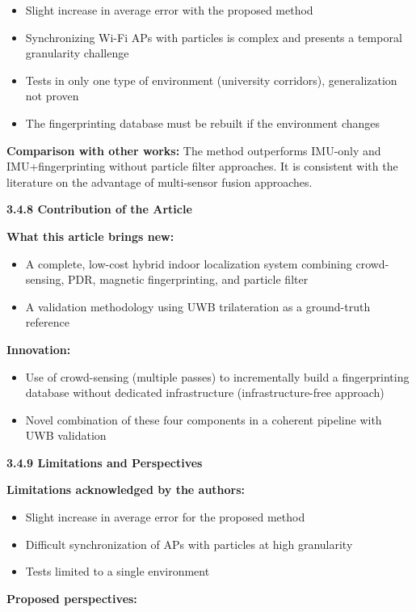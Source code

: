 \documentclass{ipgpmaster}
\begin{document}
\begin{itemize}
    \item Slight increase in average error with the proposed method
    \item Synchronizing Wi-Fi APs with particles is complex and presents a temporal granularity challenge
    \item Tests in only one type of environment (university corridors), generalization not proven
    \item The fingerprinting database must be rebuilt if the environment changes
\end{itemize}
\textbf{Comparison with other works:} The method outperforms IMU-only and IMU+fingerprinting without particle filter approaches. It is consistent with the literature on the advantage of multi-sensor fusion approaches.

 \textbf{3.4.8   Contribution of the Article}

\textbf{What this article brings new:}

\begin{itemize}
    \item A complete, low-cost hybrid indoor localization system combining crowd-sensing, PDR, magnetic fingerprinting, and particle filter
    \item A validation methodology using UWB trilateration as a ground-truth reference
\end{itemize}
\textbf{Innovation:}

\begin{itemize}
    \item Use of crowd-sensing (multiple passes) to incrementally build a fingerprinting database without dedicated infrastructure (infrastructure-free approach)
    \item Novel combination of these four components in a coherent pipeline with UWB validation
\end{itemize}
 \textbf{3.4.9   Limitations and Perspectives}

\textbf{Limitations acknowledged by the authors:}

\begin{itemize}
    \item Slight increase in average error for the proposed method
    \item Difficult synchronization of APs with particles at high granularity
    \item Tests limited to a single environment
\end{itemize}
\textbf{Proposed perspectives:}
\end{document}
